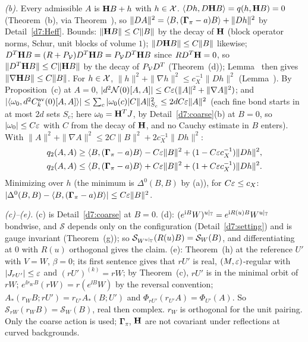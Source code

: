 \begin{detail}
\begin{step}
\end{step}
\begin{step}
\emph{(b).} Every admissible $A$ is $\mathbf H B+h$ with $h\in\mathcal X$. $\langle Dh,D\mathbf H B\rangle=q(h,\mathbf H B)=0$ (Theorem~(b), via Theorem~), so $\|DA\|^2=\langle B,(\boldsymbol\Gamma_\pi-a)B\rangle+\|Dh\|^2$ by Detail~\ref{d7:Heff}. Bounds: $\|\mathbf H B\|\le C\|B\|$ by the decay of $\mathbf H$ (block operator norms, Schur, unit blocks of volume $1$); $\|D\mathbf H B\|\le C\|B\|$ likewise; $D^T\mathbf H B=(R+P_\mathcal V)D^T\mathbf H B=P_\mathcal V D^T\mathbf H B$ since $RD^T\mathbf H=0$, so $\|D^T\mathbf H B\|\le C\|\mathbf H B\|$ by the decay of $P_\mathcal V D^T$ (Theorem~(d)); Lemma~ then gives $\|\nabla\mathbf H B\|\le C\|B\|$. For $h\in\mathcal X$, $\|h\|^2+\|\nabla h\|^2\le c_X^{-1}\|Dh\|^2$ (Lemma~). By Proposition~(c) at $A=0$, $|d^2\mathcal N(0)[A,A]|\le C\varepsilon(\|A\|^2+\|\nabla A\|^2)$; and $|\langle \omega_0,d^2C^{\rm av}_k(0)[A,A]\rangle|\le\sum_c|\omega_0(c)|C\|A\|^2_{S_c}\le2dC\varepsilon\|A\|^2$ (each fine bond starts in at most $2d$ sets $S_c$; here $\omega_0=\mathbf H^TJ$, by Detail~\ref{d7:coarse}(b) at $B=0$, so $|\omega_0|\le C\varepsilon$ with $C$ from the decay of $\mathbf H$, and no Cauchy estimate in $B$ enters). With $\|A\|^2+\|\nabla A\|^2\le2C\|B\|^2+2c_X^{-1}\|Dh\|^2$:
\[
\begin{aligned}
q_2(A,A)&\ge\langle B,(\boldsymbol\Gamma_\pi-a)B\rangle-C\varepsilon\|B\|^2+(1-C\varepsilon c_X^{-1})\|Dh\|^2,\\
q_2(A,A)&\le\langle B,(\boldsymbol\Gamma_\pi-a)B\rangle+C\varepsilon\|B\|^2+(1+C\varepsilon c_X^{-1})\|Dh\|^2 .
\end{aligned}
\]
Minimizing over $h$ (the minimum is $\Delta^0(B,B)$ by (a)), for $C\varepsilon\le c_X$: $|\Delta^0(B,B)-\langle B,(\boldsymbol\Gamma_\pi-a)B\rangle|\le C\varepsilon\|B\|^2$.
\end{step}
\begin{step}
\emph{(c)--(e).} (c) is Detail~\ref{d7:coarse} at $B=0$. (d): $(e^{\mathrm i B}W)^{u|_\mathbb T}=e^{\mathrm i R(u)B}W^{u|_\mathbb T}$ bondwise, and $\mathcal S$ depends only on the configuration (Detail~\ref{d7:setting}) and is gauge invariant (Theorem~(g)); so $\mathcal S_{W^{u|_\mathbb T}}(R(u)B)=\mathcal S_W(B)$, and differentiating at $0$ with $R(u)$ orthogonal gives the claim. (e): Theorem~(h) at the reference $U'$ with $V=W$, $\beta=0$; its first sentence gives that $rU'$ is real, $(M,\varepsilon)$-regular with $|J_{rU'}|\le\varepsilon$ and $(rU')^{(k)}=rW$; by Theorem~(c), $rU'$ is in the minimal orbit of $rW$; $e^{\ii r_WB}(rW)=r(e^{\ii B}W)$ by the reversal convention; $A_*(r_WB;rU')=r_{U'}A_*(B;U')$ and $\Phi_{rU'}(r_{U'}A)=\Phi_{U'}(A)$. So $\mathcal S_{rW}(r_WB)=\mathcal S_W(B)$, real then complex. $r_W$ is orthogonal for the unit pairing. Only the coarse action is used; $\boldsymbol\Gamma_\pi$, $\mathbf H$ are not covariant under reflections at curved backgrounds.
\end{step}
\end{detail}


